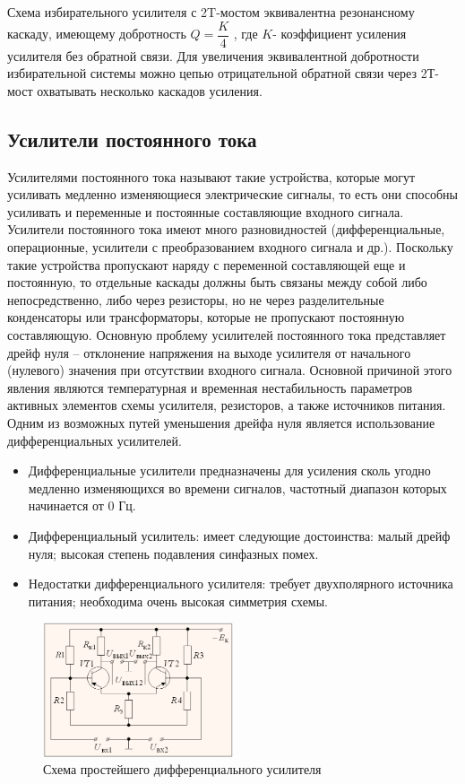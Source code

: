 \documentclass[unicode, 12pt, a4paper, oneside]{article}
\begin{document}
Схема избирательного усилителя с 2T-мостом эквивалентна резонансному каскаду, имеющему добротность $Q = \dfrac{K}{4}$ , где $K$- коэффициент усиления усилителя без обратной связи. Для увеличения эквивалентной добротности избирательной системы можно цепью отрицательной обратной связи через 2Т-мост охватывать несколько каскадов усиления.

\subsection*{Усилители постоянного тока}

Усилителями постоянного тока называют такие устройства, которые могут усиливать медленно изменяющиеся электрические сигналы, то есть они способны усиливать и переменные и постоянные составляющие входного сигнала. Усилители постоянного тока имеют много разновидностей (дифференциальные, операционные, усилители с преобразованием входного сигнала и др.). Поскольку такие устройства пропускают наряду с переменной составляющей еще и постоянную, то отдельные каскады должны быть связаны между собой либо непосредственно, либо через резисторы, но не через разделительные конденсаторы или трансформаторы, которые не пропускают постоянную составляющую. Основную проблему усилителей постоянного тока представляет дрейф нуля – отклонение напряжения на выходе усилителя от начального (нулевого) значения при отсутствии входного сигнала. Основной причиной этого явления являются температурная и временная нестабильность параметров активных элементов схемы усилителя, резисторов, а также источников питания. Одним из возможных путей уменьшения дрейфа нуля является использование дифференциальных усилителей.

\begin{itemize}
\item Дифференциальные усилители предназначены для усиления сколь угодно медленно изменяющихся во времени сигналов, частотный диапазон которых начинается от 0 Гц.
\item Дифференциальный усилитель: имеет следующие достоинства: малый дрейф нуля; высокая степень подавления синфазных помех.
\item Недостатки дифференциального усилителя: требует двухполярного источника питания; необходима очень высокая симметрия схемы.
\end{itemize}

\begin{figure}[H]
\centering
\includegraphics[width=0.5\textwidth]{7_diff_amp.png}
\caption{Схема простейшего дифференциального усилителя}
\label{fig:7_diff_amp}
\end{figure}
\end{document}
